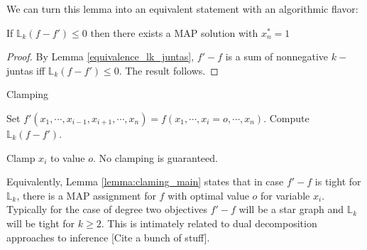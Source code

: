 We can turn this lemma into an equivalent statement with an algorithmic flavor:

\begin{lemma}\label{lemma:clamping_main}
If $\mathbb{L}_k(f-f')\leq 0$ then there exists a MAP solution with $x_n^* =1$
\end{lemma}

\begin{proof}
By Lemma \ref{equivalence_lk_juntas}, $f'-f$ is a sum of nonnegative $k-$juntas iff $\mathbb{L}_k(f-f')\leq 0$. The result follows.
\end{proof}

\begin{algorithm}[t] \label{a:clamping}
\caption{Clamping}
	Set $f'(x_1, \cdots, x_{i-1}, x_{i+1},\cdots, x_n) = f(x_1, \cdots, x_i = o, \cdots, x_n)$.
   Compute $\mathbb{L}_k(f-f')$. 
   
   {
   	Clamp $x_i$ to value $o$. 
   }
   \Else
   {
   	No clamping is guaranteed. 
  } 
\end{algorithm} 

Equivalently, Lemma \ref{lemma:claming_main} states that in case $f'-f$ is tight for $\mathbb{L}_k$, there is a MAP assignment for $f$ with optimal value $o$ for variable $x_i$. Typically for the case of degree two objectives $f'-f$ will be a star graph and $\mathbb{L}_k$ will be tight for $k \geq 2$. This is intimately related to dual decomposition approaches to inference [Cite a bunch of stuff].










